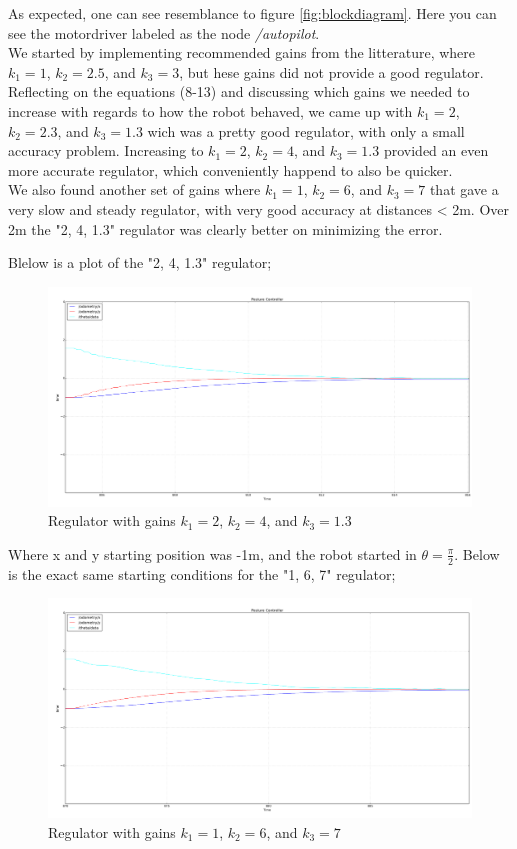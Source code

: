\documentclass[a4paper,10pt]{article}
\begin{document}
		As expected, one can see resemblance to figure \ref{fig:blockdiagram}. Here you can see the motordriver labeled as the node \textit{/autopilot}. \\


		We started by implementing recommended gains from the litterature, where $k_{1}=1$, $k_{2}=2.5$, and $k_{3}=3$, but hese gains did not provide a good regulator.
		Reflecting on the equations (8-13) and discussing which gains we needed to increase with regards to how the robot behaved, we came up with  $k_{1}=2$, $k_{2}=2.3$, and $k_{3}=1.3$
		wich was a pretty good regulator, with only a small accuracy problem. Increasing to $k_{1}=2$, $k_{2}=4$, and $k_{3}=1.3$ provided an even more accurate regulator, which
		conveniently happend to also be quicker.\\
		We also found another set of gains where $k_{1}=1$, $k_{2}=6$, and $k_{3}=7$ that gave a very slow and steady regulator, with very good accuracy at distances < 2m. Over 2m the
		"2, 4, 1.3" regulator was clearly better on minimizing the error.
		
		Blelow is a plot of the "2, 4, 1.3" regulator;
		\begin{figure}[H]
		\raggedleft
		\includegraphics[width=1.1\textwidth]{rover2_rqt_plot94_2413.png}
		\caption{Regulator with gains $k_{1}=2$, $k_{2}=4$, and $k_{3}=1.3$}	
 		\label{fig:plot2413}
		\end{figure}				 
	
		Where x and y starting position was -1m, and the robot started in $\theta=\frac{\pi}{2}$. Below is the exact same starting conditions for the "1, 6, 7" regulator;

		\begin{figure}[H]
		\centering
		\includegraphics[width=1.1\textwidth]{rover2_rqt_plot94_167.png}
		\caption{Regulator with gains $k_{1}=1$, $k_{2}=6$, and $k_{3}=7$}
 		\label{fig:plot167}
		\end{figure}
\end{document}
